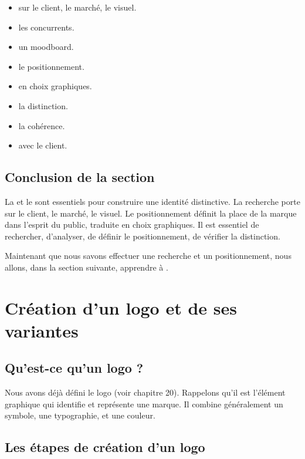 \begin{itemize}
    \item {} sur le client, le marché, le visuel.
    \item {} les concurrents.
    \item {} un moodboard.
    \item {} le positionnement.
    \item {} en choix graphiques.
    \item {} la distinction.
    \item {} la cohérence.
    \item {} avec le client.
\end{itemize}

\subsection*{Conclusion de la section}

La  et le  sont essentiels pour construire une identité distinctive. La recherche porte sur le client, le marché, le visuel. Le positionnement définit la place de la marque dans l'esprit du public, traduite en choix graphiques. Il est essentiel de rechercher, d'analyser, de définir le positionnement, de vérifier la distinction.

Maintenant que nous savons effectuer une recherche et un positionnement, nous allons, dans la section suivante, apprendre à .

\section{Création d'un logo et de ses variantes}

\subsection{Qu'est-ce qu'un logo ?}

Nous avons déjà défini le logo (voir chapitre 20). Rappelons qu'il est l'élément graphique qui identifie et représente une marque. Il combine généralement un symbole, une typographie, et une couleur.

\subsection{Les étapes de création d'un logo}

